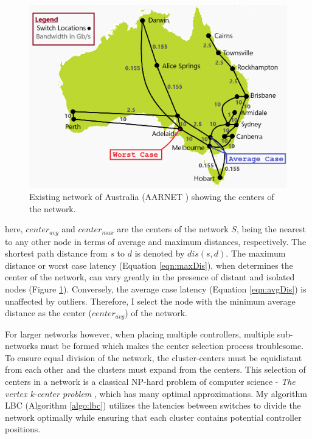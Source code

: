 \documentclass[journal]{IEEEtran}
\begin{document}
\begin{figure}
	\centering
	\includegraphics[width=\linewidth]{Images/Aarnet.png}
	\caption{Existing network of Australia (AARNET \cite{knight2011internet}) showing the centers of the network.}
	\label{fig:aarnetcc}
\end{figure}

here, $center_{avg}$ and $center_{max}$ are the centers of the network $S$, being the nearest to any other node in terms of average and maximum distances, respectively. The shortest path distance from $s$ to $d$ is denoted by $dis(s,d)$. The maximum distance or worst case latency (Equation \ref{eqn:maxDis}), when determines the center of the network, can vary greatly in the presence of distant and isolated nodes (Figure \ref{fig:aarnetcc}). Conversely, the average case latency (Equation \ref{eqn:avgDis}) is unaffected by outliers. Therefore, I select the node with the minimum average distance as the center ($center_{avg}$) of the network.

For larger networks however, when placing multiple controllers, multiple sub-networks must be formed which makes the center selection process troublesome. To ensure equal division of the network, the cluster-centers must be equidistant from each other and the clusters must expand from the centers. This selection of centers in a network is a classical NP-hard problem of computer science - \textit{The vertex k-center problem} \cite{kariv1979algorithmic}, which has many optimal approximations. My algorithm LBC (Algorithm \ref{algo:lbc}) utilizes the latencies between switches to divide the network optimally while ensuring that each cluster contains potential controller positions.
\end{document}
